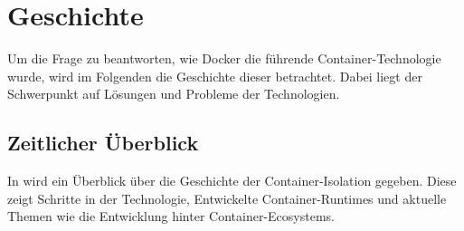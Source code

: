\chapter{Geschichte}
\label{chap:geschichte}
Um die Frage zu beantworten, wie Docker die führende Container-Technologie wurde, wird im Folgenden die Geschichte dieser betrachtet. Dabei liegt der Schwerpunkt auf Lösungen und Probleme der Technologien.
\section{Zeitlicher Überblick}
 
\label{sec:timeline}
 
In  wird ein Überblick über die Geschichte der Container-Isolation gegeben. Diese zeigt Schritte in der Technologie, Entwickelte Container-Runtimes und aktuelle Themen wie die Entwicklung hinter Container-Ecosystems.
 

